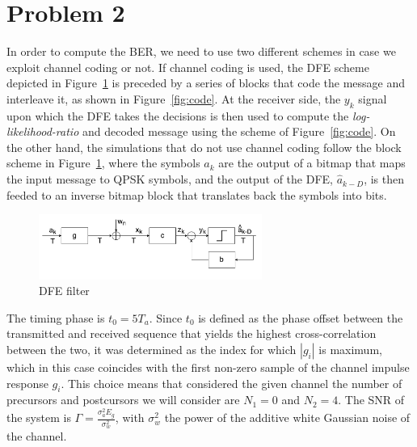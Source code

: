\documentclass[10pt]{article}
\begin{document}

\section*{Problem 2}
In order to compute the BER, we need to use two different schemes in case we exploit channel coding or not. If channel coding is used, the DFE scheme depicted in Figure~\ref{fig:DFE_system} is preceded by a series of blocks that code the message and interleave it, as shown in Figure~\ref{fig:code}. At the receiver side, the $y_k$ signal upon which the DFE takes the decisions is then used to compute the \emph{log-likelihood-ratio} and decoded message using the scheme of Figure~\ref{fig:code}. On the other hand, the simulations that do not use channel coding follow the block scheme in Figure~\ref{fig:DFE_system}, where the symbols $a_k$ are the output of a bitmap that maps the input message to QPSK symbols, and the output of the DFE, $\hat{a}_{k-D}$, is then feeded to an inverse bitmap block that translates back the symbols into bits.

\begin{figure}[h!]
	\centering
	\includegraphics[width = 0.65\textwidth]{DFE}
	\caption{DFE filter}
	\label{fig:DFE_system}
\end{figure}

The timing phase is $t_0 = 5 T_a$. Since $t_0$ is defined as the phase offset between the transmitted and received sequence that yields the highest cross-correlation between the two, it was determined as the index for which $|g_i|$ is maximum, which in this case coincides with the first non-zero sample of the channel impulse response ${g_i}$. This choice means that considered the given channel the number of precursors and postcursors we will consider are $N_1 = 0$ and $N_2 = 4$. The SNR of the system is $\Gamma = \frac{\sigma_a^2 E_g}{\sigma_w^2}$, with $\sigma_w^2$ the power of the additive white Gaussian noise of the channel.
\end{document}
